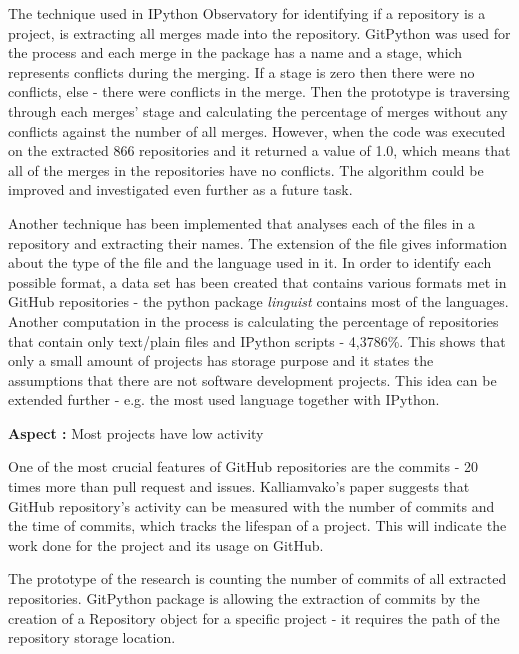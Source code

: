The technique used in IPython Observatory for identifying if a repository is a project, is extracting all merges made into the repository. GitPython was used for the process and each merge in the package has a name and a stage, which represents conflicts during the merging. If a stage is zero then there were no conflicts, else - there were conflicts in the merge. Then the prototype is traversing through each merges' stage and calculating the percentage of merges without any conflicts against the number of all merges. However, when the code was executed on the extracted 866 repositories and it returned a value of 1.0, which means that all of the merges in the repositories have no conflicts. The algorithm could be improved and investigated even further as a future task. 

Another technique has been implemented that analyses each of the files in a repository and extracting their names. The extension of the file gives information about the type of the file and the language used in it. In order to identify each possible format, a data set has been created that contains various formats met in GitHub repositories - the python package \textit{linguist}\cite{linguist} contains most of the languages. Another computation in the process is calculating the percentage of repositories that contain only text/plain files and IPython scripts - 4,3786\%. This shows that only a small amount of projects has storage purpose and it states the assumptions that there are not software development projects. This idea can be extended further - e.g. the most used language together with IPython.

\vspace{5mm}
\begin{mdframed}
\vspace{1px}
\textbf{Aspect :}  Most projects have low activity
\vspace{1px}
\end{mdframed}
\vspace{2mm}

One of the most crucial features of GitHub repositories are the commits - 20 times more than pull request and issues\cite{kalliamvakoupromises}. Kalliamvako's paper\cite{kalliamvakoupromises} suggests that GitHub repository's activity can be measured with the number of commits and the time of commits, which tracks the lifespan of a project. This will indicate the work done for the project and its usage on GitHub.

The prototype of the research is counting the number of commits of all extracted repositories. GitPython package is allowing the extraction of commits by the creation of a Repository object for a specific project - it requires the path of the repository storage location. 

